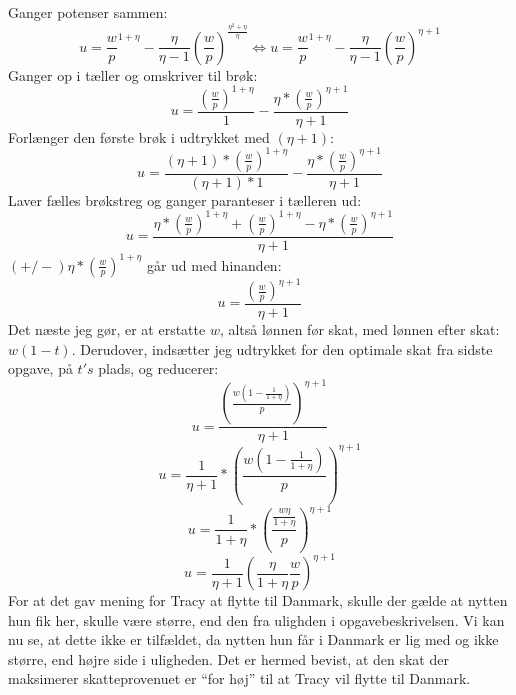 \documentclass{article}
\begin{document}
Ganger potenser sammen:
\begin{equation}
    u=\frac{w}{p}^{1+\eta}-\frac{\eta}{\eta-1}(\frac{w}{p})^{\frac{\eta^2+\eta}{\eta}} \Leftrightarrow u=\frac{w}{p}^{1+\eta}-\frac{\eta}{\eta-1}(\frac{w}{p})^{\eta+1}
\end{equation}
Ganger op i tæller og omskriver til brøk:
\begin{equation}
    u=\frac{(\frac{w}{p})^{1+\eta}}{1}-\frac{\eta*(\frac{w}{p})^{\eta+1}}{\eta+1}
\end{equation}
Forlænger den første brøk i udtrykket med $(\eta+1)$:
\begin{equation}
    u=\frac{(\eta+1)*(\frac{w}{p})^{1+\eta}}{(\eta+1)*1}-\frac{\eta*(\frac{w}{p})^{\eta+1}}{\eta+1}
\end{equation}
Laver fælles brøkstreg og ganger paranteser i tælleren ud:
\begin{equation}
    u=\frac{\eta*(\frac{w}{p})^{1+\eta}+(\frac{w}{p})^{1+\eta}-\eta*(\frac{w}{p})^{\eta+1}}{\eta+1}
\end{equation}
$(+/-)\eta*(\frac{w}{p})^{1+\eta}$ går ud med hinanden:
\begin{equation}
    u=\frac{(\frac{w}{p})^{\eta+1
    }}{\eta+1}
\end{equation}
Det næste jeg gør, er at erstatte $w$, altså lønnen før skat, med lønnen efter skat: $w(1-t)$. Derudover, indsætter jeg udtrykket for den optimale skat fra sidste opgave, på $t's$ plads, og reducerer:
\begin{equation}
    u=\frac{(\frac{w(1-\frac{1}{1+\eta})}{p})^{\eta+1
    }}{\eta+1}
\end{equation}
\begin{equation}
    u=\frac{1}{\eta+1}*(\frac{w(1-\frac{1}{1+\eta})}{p})^{\eta+1
    }
\end{equation}
\begin{equation}
    u=\frac{1}{1 + \eta} *\left(\frac{\frac{w \eta}{1+\eta}}{p}\right)^{\eta+1}
\end{equation}
\begin{equation}
u=\frac{1}{\eta+1}\left(\frac{\eta}{1+\eta} \frac{w}{p}\right)^{\eta+1}
\end{equation}
For at det gav mening for Tracy at flytte til Danmark, skulle der gælde at nytten hun fik her, skulle være større, end den fra ulighden i opgavebeskrivelsen. Vi kan nu se, at dette ikke er tilfældet, da nytten hun får i Danmark er lig med og ikke større, end højre side i uligheden. Det er hermed bevist, at den skat der maksimerer skatteprovenuet er “for høj” til at Tracy vil flytte til Danmark.
\end{document}
